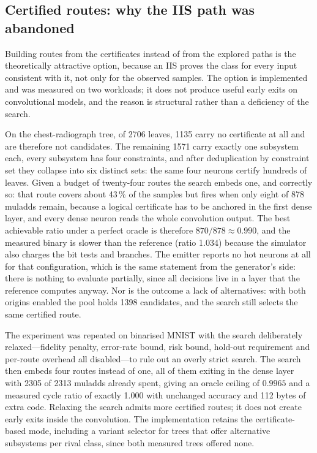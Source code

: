 \subsection{Certified routes: why the IIS path was abandoned}
\label{sec:impl-iis}

Building routes from the certificates instead of from the explored paths is the theoretically attractive option, because an \ac{IIS} proves the class for every input consistent with it, not only for the observed samples.
The option is implemented and was measured on two workloads; it does not produce useful early exits on convolutional models, and the reason is structural rather than a deficiency of the search.

On the chest-radiograph tree, of 2706 leaves, 1135 carry no certificate at all and are therefore not candidates.
The remaining 1571 carry exactly one subsystem each, every subsystem has four constraints, and after deduplication by constraint set they collapse into six distinct sets: the same four neurons certify hundreds of leaves.
Given a budget of twenty-four routes the search embeds one, and correctly so: that route covers about 43\,\% of the samples but fires when only eight of 878 muladds remain, because a logical certificate has to be anchored in the first dense layer, and every dense neuron reads the whole convolution output.
The best achievable ratio under a perfect oracle is therefore \(870/878 \approx 0.990\), and the measured binary is slower than the reference (ratio 1.034) because the simulator also charges the bit tests and branches.
The emitter reports no hot neurons at all for that configuration, which is the same statement from the generator's side: there is nothing to evaluate partially, since all decisions live in a layer that the reference computes anyway.
Nor is the outcome a lack of alternatives: with both origins enabled the pool holds 1398 candidates, and the search still selects the same certified route.

The experiment was repeated on binarised MNIST with the search deliberately relaxed---fidelity penalty, error-rate bound, risk bound, hold-out requirement and per-route overhead all disabled---to rule out an overly strict search.
The search then embeds four routes instead of one, all of them exiting in the dense layer with 2305 of 2313 muladds already spent, giving an oracle ceiling of \(0.9965\) and a measured cycle ratio of exactly 1.000 with unchanged accuracy and 112 bytes of extra code.
Relaxing the search admits more certified routes; it does not create early exits inside the convolution.
The implementation retains the certificate-based mode, including a variant selector for trees that offer alternative subsystems per rival class, since both measured trees offered none.


